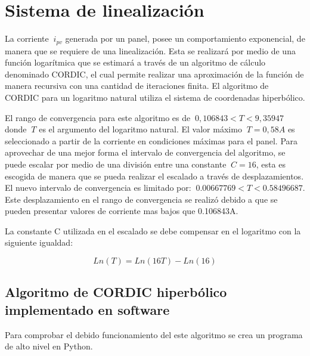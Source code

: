 \chapter{Sistema de linealización}
\label{ch:linealizacion}

La corriente  $\ i_{pv} $ generada por un panel, posee un comportamiento exponencial, de manera que se requiere de una linealización.  Esta se realizará por medio de una función logarítmica que se estimará a través de un algoritmo de cálculo denominado CORDIC, el cual permite realizar una aproximación de la función de manera recursiva con una cantidad de iteraciones finita. El algoritmo de CORDIC para un logaritmo natural utiliza el sistema de coordenadas hiperbólico.

El rango de convergencia para este algoritmo es de $\ 0,106843 < T < 9,35947 $ donde $\ T $ es el argumento del logaritmo natural. El valor máximo $\ T = 0,58A $ es seleccionado a partir de la corriente en condiciones máximas para el panel. Para aprovechar de una mejor forma el intervalo de convergencia del algoritmo, se puede escalar por medio de una división entre una constante $\ C = 16$, esta es escogida de manera que se pueda realizar el escalado a través de desplazamientos. El nuevo intervalo de convergencia es limitado por: $\ 0.00667769 < T < 0.58496687 $. Este desplazamiento en el rango de convergencia  se realizó debido a que se pueden presentar valores de corriente mas bajos que 0.106843A.

La constante C utilizada en el escalado se debe compensar en el logaritmo con la siguiente igualdad: 

\begin{equation} \label{eq:ej1}
  Ln \left( T \right)
  = Ln \left( 16T \right) - Ln\left( 16 \right) 
\end{equation}  

  

\section{Algoritmo de CORDIC hiperbólico implementado en software}
 
Para comprobar el debido funcionamiento del este algoritmo se crea un programa de alto nivel en Python.  


